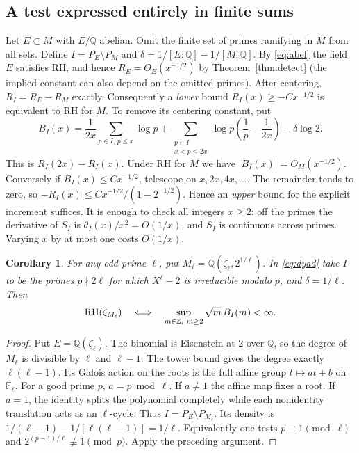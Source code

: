 \documentclass[11pt]{article}
\newtheorem{corollary}[theorem]{Corollary}
\newcommand{\Q}{\mathbb Q}\newcommand{\R}{\mathbb R}
\begin{document}
\subsection{A test expressed entirely in finite sums}
Let $E\subset M$ with $E/\Q$ abelian. Omit the finite set of primes ramifying in $M$ from all sets. Define $I=P_E\setminus P_M$ and $\delta=1/[E:\Q]-1/[M:\Q]$. By \eqref{eq:abel} the field $E$ satisfies RH, and hence $R_E=O_E(x^{-1/2})$ by Theorem~\ref{thm:detect} (the implied constant can also depend on the omitted primes). After centering, $R_I=R_E-R_M$ exactly. Consequently a \emph{lower} bound $R_I(x)\ge-Cx^{-1/2}$ is equivalent to RH for $M$. To remove its centering constant, put
\begin{equation}\label{eq:dyad}
 B_I(x)=\frac{1}{2x}\sum_{p\in I,\,p\le x}\log p
       +\sum_{\substack{p\in I\\x<p\le2x}}\log p\left(\frac1p-\frac1{2x}\right)
       -\delta\log 2.
\end{equation}
This is $R_I(2x)-R_I(x)$. Under RH for $M$ we have $|B_I(x)|=O_M(x^{-1/2})$. Conversely if $B_I(x)\le Cx^{-1/2}$, telescope on $x,2x,4x,\ldots$. The remainder tends to zero, so $-R_I(x)\le Cx^{-1/2}/(1-2^{-1/2})$. Hence an \emph{upper} bound for the explicit increment suffices. It is enough to check all integers $x\ge2$: off the primes the derivative of $S_I$ is $\theta_I(x)/x^2=O(1/x)$, and $S_I$ is continuous across primes. Varying $x$ by at most one costs $O(1/x)$.

\begin{corollary}\label{cor:poly}
For any odd prime $\ell$, put $M_\ell=\Q(\zeta_\ell,2^{1/\ell})$. In \eqref{eq:dyad} take $I$ to be the primes $p\nmid 2\ell$ for which $X^\ell-2$ is irreducible modulo $p$, and $\delta=1/\ell$. Then
\[
       \mathrm{RH}(\zeta_{M_\ell})
          \quad\Longleftrightarrow\quad
       \sup_{m\in\mathbb Z,\ m\ge2}\sqrt m\, B_I(m)<\infty .
\]
\end{corollary}
\begin{proof}
Put $E=\Q(\zeta_\ell)$. The binomial is Eisenstein at 2 over $\Q$, so the degree of $M_\ell$ is divisible by $\ell$ and $\ell-1$. The tower bound gives the degree exactly $\ell(\ell-1)$. Its Galois action on the roots is the full affine group $t\mapsto at+b$ on $\mathbb F_\ell$. For a good prime $p$, $a=p\bmod\ell$. If $a\ne1$ the affine map fixes a root. If $a=1$, the identity splits the polynomial completely while each nonidentity translation acts as an $\ell$-cycle. Thus $I=P_E\setminus P_{M_\ell}$. Its density is $1/(\ell-1)-1/[\ell(\ell-1)]=1/\ell$. Equivalently one tests $p\equiv1\pmod\ell$ and $2^{(p-1)/\ell}\not\equiv1\pmod p$. Apply the preceding argument.
\end{proof}
\end{document}
